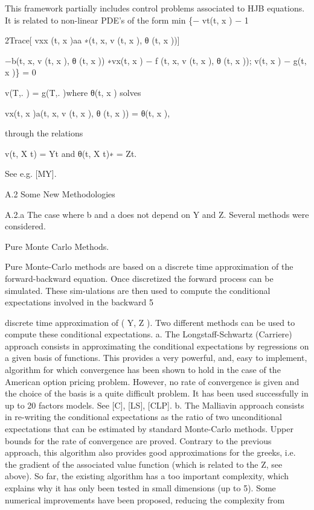 \documentclass[11pt]{article}
\begin{document}
This framework partially includes control problems associated to HJB equations. It is related to non-linear PDE's of the form min \{− vt(t, x ) − 1

2Trace[ vxx (t, x )aa ∗(t, x, v (t, x ), θ (t, x ))]

−b(t, x, v (t, x ), θ (t, x )) ∗vx(t, x ) − f (t, x, v (t, x ), θ (t, x )); v(t, x ) − g(t, x )\} = 0

v(T,. ) = g(T,. )where θ(t, x ) solves

vx(t, x )a(t, x, v (t, x ), θ (t, x )) = θ(t, x ),

through the relations

v(t, X t) = Yt and θ(t, X t)∗ = Zt.

See e.g. [MY].

A.2 Some New Methodologies

A.2.a The case where b and a does not depend on Y and Z. Several methods were considered.

Pure Monte Carlo Methods.

Pure Monte-Carlo methods are based on a discrete time approximation of the forward-backward equation. Once discretized the forward process can be simulated. These sim-ulations are then used to compute the conditional expectations involved in the backward 5

discrete time approximation of ( Y, Z ). Two different methods can be used to compute these conditional expectations. a. The Longstaff-Schwartz (Carriere) approach consists in approximating the conditional expectations by regressions on a given basis of functions. This provides a very powerful, and, easy to implement, algorithm for which convergence has been shown to hold in the case of the American option pricing problem. However, no rate of convergence is given and the choice of the basis is a quite difficult problem. It has been used successfully in up to 20 factors models. See [C], [LS], [CLP]. b. The Malliavin approach consists in re-writing the conditional expectations as the ratio of two unconditional expectations that can be estimated by standard Monte-Carlo methods. Upper bounds for the rate of convergence are proved. Contrary to the previous approach, this algorithm also provides good approximations for the greeks, i.e. the gradient of the associated value function (which is related to the Z, see above). So far, the existing algorithm has a too important complexity, which explains why it has only been tested in small dimensions (up to 5). Some numerical improvements have been proposed, reducing the complexity from
\end{document}
